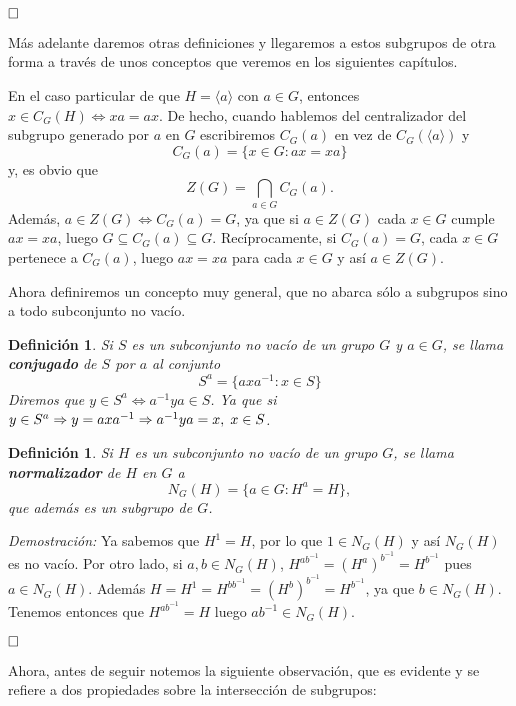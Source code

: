 \documentclass[12pt]{article}
\newtheorem{definition}[theorem]{Definición}
\begin{document}
$\hfill \square$

Más adelante daremos otras definiciones y llegaremos a estos subgrupos de otra forma a través de unos conceptos que veremos en los siguientes capítulos.

En el caso particular de que $H = \langle a \rangle$ con $a \in G$, entonces $x \in C_{G}(H)\Leftrightarrow xa = ax$. De hecho, cuando hablemos del centralizador del subgrupo generado por $a$ en $G$ escribiremos $C_{G}(a)$ en vez de $C_{G}(\langle a \rangle)$ y $$C_{G}(a) = \lbrace x \in G : ax = xa\rbrace$$ y, es obvio que $$Z(G) = \bigcap_{a \in G} C_{G}(a).$$ Además, $a \in Z(G) \Leftrightarrow C_{G}(a) = G$, ya que si $a \in Z(G)$ cada $x \in G$ cumple $ax = xa$, luego $G \subseteq C_{G}(a) \subseteq G$. Recíprocamente, si $C_{G}(a) = G$, cada $x \in G$ pertenece a $C_{G}(a)$, luego $ax = xa$ para cada $x \in G$ y así $a \in Z(G)$.

Ahora definiremos un concepto muy general, que no abarca sólo a subgrupos sino a todo subconjunto no vacío.

\begin{definition} \label{eq:conjugado} Si $S$ es un subconjunto no vacío de un grupo $G$ y $a \in G$, se llama \textbf{conjugado} de $S$ por $a$ al conjunto $$S^{a} = \lbrace axa^{-1}: x \in S\rbrace$$ Diremos que $y \in S^{a} \Leftrightarrow a^{-1}ya \in S$. Ya que si $y \in S^{a} \Rightarrow y = axa^{-1}\Rightarrow a^{-1}ya = x, \hspace{0.1cm} x \in S$.
\end{definition} 

\begin{definition}\label{eq:normalizador} Si $H$ es un subconjunto no vacío de un grupo $G$, se llama \textbf{normalizador} de $H$ en $G$ a $$N_{G}(H) = \lbrace a \in G : H^{a} = H\rbrace,$$ que además es un subgrupo de $G$.
\end{definition}

\emph{Demostración: } Ya sabemos que $H^{1} = H$, por lo que $1 \in N_{G}(H)$ y así $N_{G}(H)$ es no vacío. Por otro lado, si $a,b \in N_{G}(H)$, $H^{ab^{-1}} = (H^{a})^{b^{-1}} = H^{b^{-1}}$ pues $a \in N_{G}(H)$. Además $H = H^{1} = H^{bb^{-1}} = (H^{b})^{b^{-1}} = H^{b^{-1}}$, ya que $b \in N_{G}(H)$. Tenemos entonces que $H^{ab^{-1}} = H$ luego $ab^{-1} \in N_{G}(H)$.

$\hfill \square$

Ahora, antes de seguir notemos la siguiente observación, que es evidente y se refiere a dos propiedades sobre la intersección de subgrupos:
\end{document}
